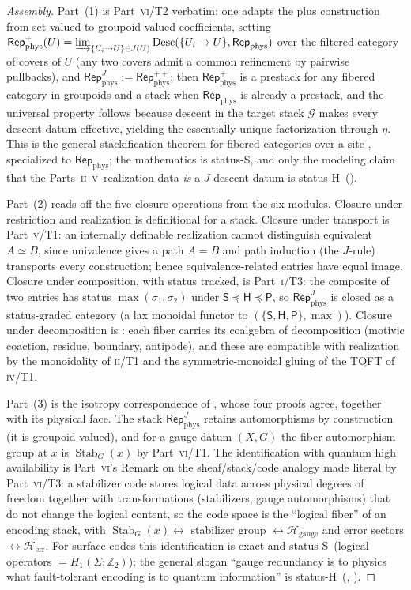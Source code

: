 \documentclass[12pt]{article}
\theoremstyle{definition}
\theoremstyle{remark}
\newcommand{\Repphys}{\mathsf{Rep}_{\mathrm{phys}}}
\newcommand{\Stab}{\operatorname{Stab}}
\newcommand{\Sstat}{\textsf{S}}
\newcommand{\Hstat}{\textsf{H}}
\newcommand{\Pstat}{\textsf{P}}
\newcommand{\stle}{\preceq}
\newcommand{\Ho}{\mathcal{H}}
\newcommand{\Hgauge}{\Ho_{\mathrm{gauge}}}
\newcommand{\Herr}{\Ho_{\mathrm{err}}}
\newcommand{\ZZ}{\mathbb{Z}}
\newcommand{\PI}{\textsc{i}}
\newcommand{\PII}{\textsc{ii}}
\newcommand{\PIV}{\textsc{iv}}
\newcommand{\PV}{\textsc{v}}
\newcommand{\PVI}{\textsc{vi}}
\begin{document}
\begin{proof}[Assembly]
Part~(1) is Part~\PVI/T2 verbatim: one adapts the plus construction from set-valued to
groupoid-valued coefficients, setting
$\Repphys^{+}(U)=\varinjlim_{\{U_i\to U\}\in J(U)}
\mathrm{Desc}(\{U_i\to U\},\Repphys)$ over the filtered category of covers of $U$
(any two covers admit a common refinement by pairwise pullbacks), and
$\Repphys^{J}:=\Repphys^{++}$; then $\Repphys^{+}$ is a prestack for any fibered
category in groupoids and a stack when $\Repphys$ is already a prestack, and the
universal property
follows because descent in the target stack $\mathcal G$ makes every descent datum
effective, yielding the essentially unique factorization through $\eta$.  This is the
general stackification theorem for fibered categories over a site
\cite{Giraud1971,Vistoli2004}, specialized to $\Repphys$; the mathematics is
status-\Sstat, and only the modeling claim that the Parts~\PII--\PV\ realization data
\emph{is} a $J$-descent datum is status-\Hstat\ ().

Part~(2) reads off the five closure operations from the six modules.  Closure under
restriction and realization is definitional for a stack.  Closure under transport is
Part~\PV/T1: an internally definable realization cannot distinguish equivalent
$A\simeq B$, since univalence gives a path $A=B$ and path induction (the $J$-rule)
transports every construction; hence equivalence-related entries have equal image.
Closure under composition, with status tracked, is Part~\PI/T3: the composite of two
entries has status $\max(\sigma_1,\sigma_2)$ under $\Sstat\stle\Hstat\stle\Pstat$, so
$\Repphys^{J}$ is closed as a status-graded category (a lax monoidal functor to
$(\{\Sstat,\Hstat,\Pstat\},\max)$).  Closure under decomposition is
: each fiber carries its coalgebra of decomposition (motivic coaction,
residue, boundary, antipode), and these are compatible with realization by the
monoidality of \PII/T1 and the symmetric-monoidal gluing of the TQFT of \PIV/T1.

Part~(3) is the isotropy correspondence of , whose four proofs
agree, together with its physical face.  The stack $\Repphys^{J}$ retains automorphisms
by construction (it is groupoid-valued), and for a gauge datum $(X,G)$ the fiber
automorphism group at $x$ is $\Stab_G(x)$ by Part~\PVI/T1.  The identification with
quantum high availability is Part~\PVI's Remark on the sheaf/stack/code analogy made
literal by Part~\PVI/T3: a stabilizer code stores logical data across physical degrees
of freedom together with transformations (stabilizers, gauge automorphisms) that do not
change the logical content, so the code space is the ``logical fiber'' of an encoding
stack, with $\Stab_G(x)\leftrightarrow$ stabilizer group $\leftrightarrow \Hgauge$ and
error sectors $\leftrightarrow\Herr$.  For surface codes this identification is exact
and status-\Sstat\ (logical operators $=H_1(\Sigma;\ZZ_2)$); the general slogan
``gauge redundancy is to physics what fault-tolerant encoding is to quantum
information'' is status-\Hstat\ (, ).
\end{proof}
\end{document}
